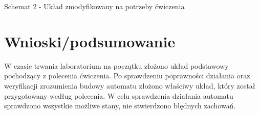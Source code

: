 \documentclass[12pt,a4paper]{article}
\begin{document}
	\vspace{0.5cm}
	\begin{center}
		Schemat 2 - Układ zmodyfikowany na potrzeby ćwiczenia
	\end{center}
	
	\section{Wnioski/podsumowanie}
	
	W czasie trwania laboratorium na początku złożono układ podstawowy pochodzący z polecenia ćwiczenia.
	Po sprawdzeniu poprawności działania oraz weryfikacji zrozumienia budowy automatu złożono właściwy
	układ, który został przygotowany według polecenia. W celu sprawdzenia działania automatu sprawdzono wszystkie możliwe stany,
	nie stwierdzono błędnych zachowań.
\end{document}
